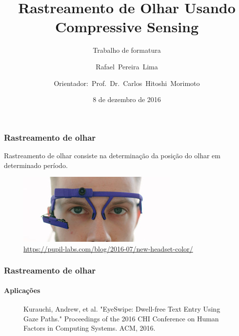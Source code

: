\documentclass[11pt]{beamer}
\author{\mbox{Rafael Pereira Lima} \and
		\mbox{Orientador: Prof. Dr. Carlos Hitoshi Morimoto}}
\title{Rastreamento de Olhar Usando Compressive Sensing}
\subtitle{Trabalho de formatura}
\institute{IME-USP}
\date{8 de dezembro de 2016}
\begin{document}
\begin{frame}
\titlepage
\end{frame}

\begin{frame}
\frametitle{Rastreamento de olhar}
Rastreamento de olhar consiste na determinação da posição do olhar em determinado período.
\begin{figure}
\includegraphics[scale=1]{imagens/dmk-headset.jpg}
\caption{\tiny{\url{https://pupil-labs.com/blog/2016-07/new-headset-color/}}}
\end{figure}
\end{frame}

\begin{frame}
\frametitle{Rastreamento de olhar}
\framesubtitle{Aplicações}
\begin{figure}
	\caption{\tiny{Kurauchi, Andrew, et al. "EyeSwipe: Dwell-free Text Entry Using Gaze Paths." Proceedings of the 2016 CHI Conference on Human Factors in Computing Systems. ACM, 2016.}}
\end{figure}
\end{frame}
\end{document}

